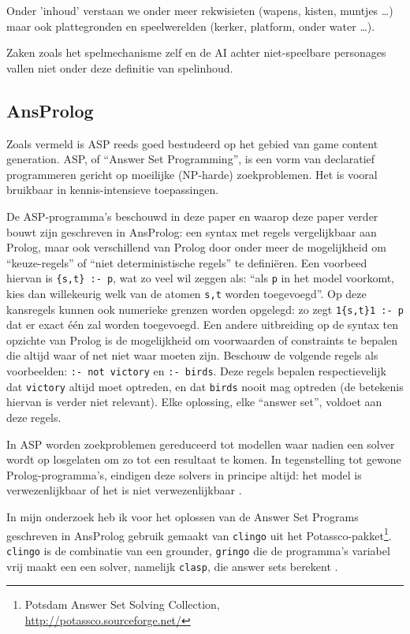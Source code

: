 \documentclass{article}
\begin{document}
	Onder 'inhoud' verstaan we onder meer rekwisieten (wapens, kisten, muntjes \dots) maar ook plattegronden en speelwerelden (kerker, platform, onder water \dots).
	
	Zaken zoals het spelmechanisme zelf en de AI achter niet-speelbare personages vallen niet onder deze definitie van spelinhoud.
	\subsection{AnsProlog}
Zoals vermeld is ASP reeds goed bestudeerd op het gebied van game content generation. ASP, of ``Answer Set Programming'', is een vorm van declaratief programmeren gericht op moeilijke (NP-harde) zoekproblemen. Het is vooral bruikbaar in kennis-intensieve toepassingen. 

De ASP-programma's beschouwd in deze paper en waarop deze paper verder bouwt zijn geschreven in AnsProlog: een syntax met regels vergelijkbaar aan Prolog, maar ook verschillend van Prolog door onder meer de mogelijkheid om ``keuze-regels'' of ``niet deterministische regels'' te defini\"eren. Een voorbeed hiervan is \texttt{\{s,t\} :- p}, wat zo veel wil zeggen als: ``als \texttt{p} in het model voorkomt, kies dan willekeurig welk van de atomen \texttt{s,t} worden toegevoegd''. Op deze kansregels kunnen ook numerieke grenzen worden opgelegd: zo zegt \texttt{1\{s,t\}1 :- p} dat er exact \'e\'en zal worden toegevoegd. Een andere uitbreiding op de syntax ten opzichte van Prolog is de mogelijkheid om voorwaarden of constraints te bepalen die altijd waar of net niet waar moeten zijn. Beschouw de volgende regels als voorbeelden: \texttt{:- not victory} en \texttt{:- birds}. Deze regels bepalen respectievelijk dat \texttt{victory} altijd moet optreden, en dat \texttt{birds} nooit mag optreden (de betekenis hiervan is verder niet relevant). Elke oplossing, elke ``answer set'', voldoet aan deze regels.

 In ASP worden zoekproblemen gereduceerd tot modellen waar nadien een solver wordt op losgelaten om zo tot een resultaat te komen. In tegenstelling tot gewone Prolog-programma's, eindigen deze solvers in principe altijd: het model is verwezenlijkbaar of het is niet verwezenlijkbaar \cite{vladimir}.
 
 In mijn onderzoek heb ik voor het oplossen van de Answer Set Programs geschreven in AnsProlog gebruik gemaakt van  \texttt{clingo} uit het Potassco-pakket\footnote{Potsdam Answer Set Solving Collection, \\\url{http://potassco.sourceforge.net/}}. \texttt{clingo} is de combinatie van een grounder, \texttt{gringo} die de programma's variabel vrij maakt een een solver, namelijk \texttt{clasp}, die answer sets berekent \cite{clingo}. 
\end{document}
